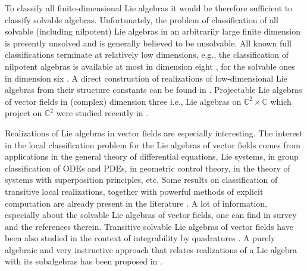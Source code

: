 \documentclass[pdftex]{sigma}
\numberwithin{equation}{section}
\begin{document}
To classify all finite-dimensional Lie algebras it would be therefore sufficient to classify solvable algebras. Unfortunately, the problem of classification of all solvable (including nilpotent) Lie algebras in
an arbitrarily large finite dimension is presently unsolved and is generally believed to be unsolvable.
All known full classifications terminate at relatively low dimensions, e.g., the classification of nilpotent
algebras is available at most in dimension eight \cite{10,11}, for the solvable ones in dimension six \cite{12,13}.
A direct construction of realizations of low-dimensional Lie algebras from their structure constants can be found in \cite{Popovych03}. Projectable Lie algebras of vector fields in (complex) dimension three i.e., Lie algebras on ${\mathbb C}^2\times {\mathbb C}$ which project on ${\mathbb C}^2$ were studied recently in \cite{Schneider18}.

Realizations of Lie algebras in vector fields are especially interesting. The interest in the local classification problem for the Lie algebras of vector fields comes from applications in the general theory
of differential equations, Lie systems, in group classification of ODEs and PDEs, in geometric control theory, in the theory of systems with superposition principles, etc.
Some results on classification of transitive local realizations, together with powerful methods
of explicit computation are already present in the literature \cite{Blattner69,Draisma12,GS64,SW014}.
A lot of information, especially about the solvable Lie algebras of vector fields, one can find in survey \cite{SW014} and the references therein. Transitive solvable Lie algebras of vector fields have been also studied in the context of integrability by quadratures \cite{CFGR15,CFG16}. A purely algebraic and very instructive approach that relates realizations of a Lie algebra with its subalgebras has been proposed in \cite{Magazev15}.
\end{document}
